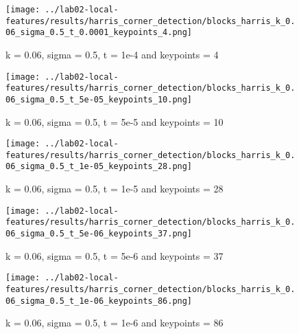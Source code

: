 \documentclass{ETHExercise}
\begin{document}
\begin{figure}
    \texttt{[image: ../lab02-local-features/results/harris\_corner\_detection/blocks\_harris\_k\_0.06\_sigma\_0.5\_t\_0.0001\_keypoints\_4.png]}
    \caption{k = 0.06, sigma = 0.5, t = 1e-4 and keypoints = 4}
  \endminipage\hfill
    \texttt{[image: ../lab02-local-features/results/harris\_corner\_detection/blocks\_harris\_k\_0.06\_sigma\_0.5\_t\_5e-05\_keypoints\_10.png]}
    \caption{k = 0.06, sigma = 0.5, t = 5e-5 and keypoints = 10}
  \endminipage\hfill
    \texttt{[image: ../lab02-local-features/results/harris\_corner\_detection/blocks\_harris\_k\_0.06\_sigma\_0.5\_t\_1e-05\_keypoints\_28.png]}
    \caption{k = 0.06, sigma = 0.5, t = 1e-5 and keypoints = 28}
  \endminipage\hfill
    \texttt{[image: ../lab02-local-features/results/harris\_corner\_detection/blocks\_harris\_k\_0.06\_sigma\_0.5\_t\_5e-06\_keypoints\_37.png]}
    \caption{k = 0.06, sigma = 0.5, t = 5e-6 and keypoints = 37}
  \endminipage\space\space\space 
    \texttt{[image: ../lab02-local-features/results/harris\_corner\_detection/blocks\_harris\_k\_0.06\_sigma\_0.5\_t\_1e-06\_keypoints\_86.png]}
    \caption{k = 0.06, sigma = 0.5, t = 1e-6 and keypoints = 86}
  \endminipage
\end{figure}
\end{document}
